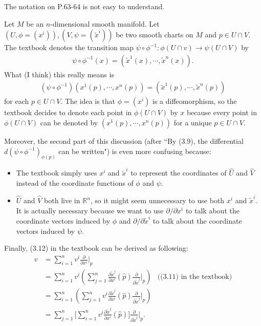 \begin{rem}\label{remark_3_12}
  The notation on P.63-64 is not easy to understand.

  Let $M$ be an $n$-dimensional smooth manifold.
  Let $(U, \phi = (x^i)), (V, \psi = (\tilde{x}^i))$ be two smooth charts on $M$ and $p \in U \cap V$.
  The textbook denotes the transition map $\psi \circ \phi^{-1}: \phi(U \cap v) \rightarrow \psi(U \cap V)$ by
  \begin{align*}
    \psi \circ \phi^{-1}(x) = (\tilde{x}^1(x), \cdots, \tilde{x}^n(x)).
  \end{align*}
  What (I think) this really means is
  \begin{align*}
    (\psi \circ \phi^{-1})(x^1(p), \cdots, x^n(p)) = (\tilde{x}^1(p), \cdots, \tilde{x}^n(p))
  \end{align*}
  for each $p \in U \cap V$.
  The idea is that $\phi = (x^i)$ is a diffeomorphism, so the textbook decides to denote each point in $\phi(U \cap V)$ by $x$ because every point in $\phi(U \cap V)$ can be denoted by $(x^1(p), \cdots, x^n(p))$ for a unique $p \in U \cap V$.

  Moreover, the second part of this discussion (after ``By (3.9), the differential $d(\psi \circ \phi^{-1})_{\phi(p)}$ can be written") is even more confusing because:
  \begin{itemize}
    \item
      The textbook simply uses $x^i$ and $\tilde{x}^i$ to represent the coordinates of $\hat{U}$ and $\hat{V}$ instead of the coordinate functions of $\phi$ and $\psi$.
    \item
      $\hat{U}$ and $\hat{V}$ both live in $\mathbb{R}^n$, so it might seem unnecessary to use both $x^i$ and $\tilde{x}^i$.
      It is actually necessary because we want to use $\partial / \partial x^i$ to talk about the coordinate vectors induced by $\phi$ and $\partial / \partial \tilde{x}^i$ to talk about the coordinate vectors induced by $\psi$.
  \end{itemize}

  Finally, (3.12) in the textbook can be derived as following:
  \begin{align*}
    v &= \sum_{i=1}^{n} v^i \frac{\partial}{\partial x^i} \Big\vert_p \\
      &= \sum_{i=1}^{n} v^i (\sum_{j=1}^{n} \frac{\partial\tilde{x}^j}{\partial x^i}(\hat{p})\frac{\partial}{\partial \tilde{x}^j}\Big\vert_p) & \text{((3.11) in the textbook)}\\
      &= \sum_{i=1}^{n} (\sum_{j=1}^{n} v^i\frac{\partial\tilde{x}^j}{\partial x^i}(\hat{p})\frac{\partial}{\partial \tilde{x}^j}\Big\vert_p) \\
      &= \sum_{j=1}^{n} \big[\sum_{i=1}^{n} v^i\frac{\partial\tilde{x}^j}{\partial x^i}(\hat{p})\big]\frac{\partial}{\partial \tilde{x}^j}\Big\vert_p.
  \end{align*}
\end{rem}

